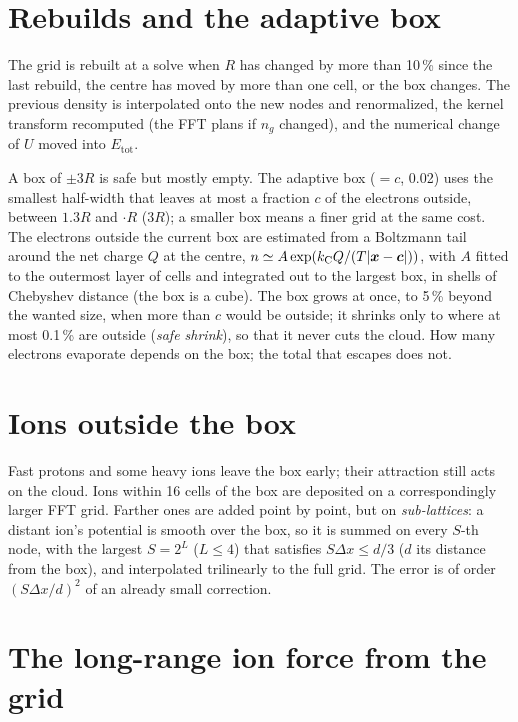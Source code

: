 \section{Rebuilds and the adaptive box}

The grid is rebuilt at a solve when $R$ has changed by more than 10\,\% since the last rebuild, the centre has moved by
more than one cell, or the box changes.
The previous density is interpolated onto the new nodes and renormalized, the kernel transform recomputed (the FFT
plans if $n_g$ changed), and the numerical change of $U$ moved into $E_{\mathrm{tot}}$.

A box of $\pm3R$ is safe but mostly empty.
The adaptive box ($=c$, 0.02) uses the smallest half-width that leaves at most a fraction $c$
of the electrons outside, between $1.3R$ and $\cdot R$ ($3R$); a smaller box means a finer grid
at the same cost.
The electrons outside the current box are estimated from a Boltzmann tail around the net charge $Q$ at the centre,
$n\simeq A\exp(k_{\mathrm C} Q/(T|\bm{x}-\bm{c}|))$, with $A$ fitted to the outermost layer of cells and integrated out to the
largest box, in shells of Chebyshev distance (the box is a cube).
The box grows at once, to 5\,\% beyond the wanted size, when more than $c$ would be outside; it shrinks only to where
at most 0.1\,\% are outside (\emph{safe shrink}), so that it never cuts the cloud.
How many electrons evaporate depends on the box; the total that escapes does not.

\section{Ions outside the box}

Fast protons and some heavy ions leave the box early; their attraction still acts on the cloud.
Ions within 16 cells of the box are deposited on a correspondingly larger FFT grid.
Farther ones are added point by point, but on \emph{sub-lattices}: a distant ion's potential is smooth over the box, so
it is summed on every $S$-th node, with the largest $S = 2^L$ ($L\le4$) that satisfies $S\Delta x\le d/3$ ($d$ its
distance from the box), and interpolated trilinearly to the full grid.
The error is of order $(S\Delta x/d)^2$ of an already small correction.

\section{The long-range ion force from the grid}
\label{sec:longrange}

